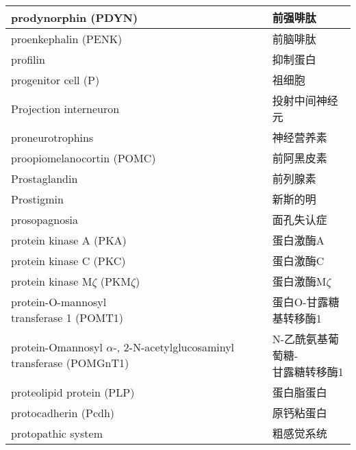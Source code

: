 \begin{longtable}{lll}
	\midrule
	prodynorphin (PDYN)  && 前强啡肽  \\
	
	\midrule
	proenkephalin (PENK)  && 前脑啡肽  \\
	
	\midrule
	profilin  && 抑制蛋白  \\
	
	\midrule
	progenitor cell (P)   && 祖细胞  \\
	
	\midrule
	Projection interneuron   && 投射中间神经元  \\
	
	\midrule
	proneurotrophins   && 神经营养素  \\
	
	\midrule
	proopiomelanocortin (POMC)  && 前阿黑皮素  \\
	
	\midrule
	Prostaglandin   && 前列腺素  \\
	
	\midrule
	Prostigmin   && 新斯的明  \\
	
	\midrule
	prosopagnosia   && 面孔失认症  \\
	
	\midrule
	protein kinase A (PKA)   && 蛋白激酶A  \\
	
	\midrule
	protein kinase C (PKC)   && 蛋白激酶C  \\
	
	\midrule
	protein kinase M$\zeta$ (PKM$\zeta$)   && 蛋白激酶M$\zeta$  \\
	
	\midrule
	\makecell[l]{protein-O-mannosyl \\ transferase 1 (POMT1)}     && 蛋白O-甘露糖基转移酶1   \\
	
	\midrule
	\makecell[l]{protein-Omannosyl $\alpha$-,\\2-N-acetylglucosaminyl transferase \\(POMGnT1)}     && \makecell[l]{N-乙酰氨基葡萄糖-\\甘露糖转移酶1}  \\
	
	\midrule
	proteolipid protein (PLP)   && 蛋白脂蛋白  \\
	
	\midrule
	protocadherin (Pcdh)  && 原钙粘蛋白  \\
	
	\midrule
	protopathic system   && 粗感觉系统  \\
	

\end{longtable}
